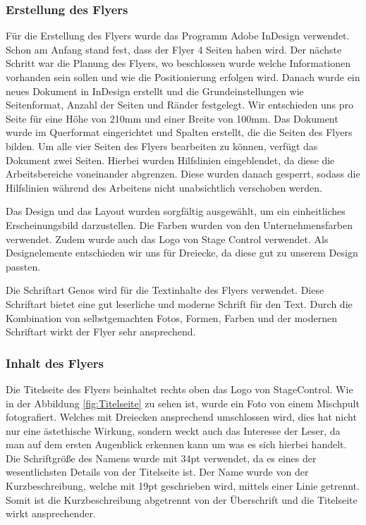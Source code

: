 \subsubsection{Erstellung des Flyers}
Für die Erstellung des Flyers wurde das Programm Adobe InDesign verwendet. Schon am Anfang stand fest, dass der Flyer 4 Seiten haben wird. Der nächste Schritt war die Planung des Flyers, wo beschlossen wurde welche Informationen vorhanden sein sollen und wie die Positionierung erfolgen wird. Danach wurde ein neues Dokument in InDesign erstellt und die Grundeinstellungen wie Seitenformat, Anzahl der Seiten und Ränder festgelegt. Wir entschieden uns pro Seite für eine Höhe von 210mm und einer Breite von 100mm. Das Dokument wurde im Querformat eingerichtet und Spalten erstellt, die die Seiten des Flyers bilden. Um alle vier Seiten des Flyers bearbeiten zu können, verfügt das Dokument zwei Seiten. Hierbei wurden Hilfslinien eingeblendet, da diese die Arbeitsbereiche voneinander abgrenzen. Diese wurden danach gesperrt, sodass die Hilfslinien während des Arbeitens nicht unabsichtlich verschoben werden. 

Das Design und das Layout wurden sorgfältig ausgewählt, um ein einheitliches Erscheinungsbild darzustellen. Die Farben wurden von den Unternehmensfarben verwendet. Zudem wurde auch das Logo von Stage Control verwendet. Als Designelemente entschieden wir uns für Dreiecke, da diese gut zu unserem Design passten. 

Die Schriftart Genos wird für die Textinhalte des Flyers verwendet. Diese Schriftart bietet eine gut leserliche und moderne Schrift für den Text. Durch die Kombination von selbstgemachten Fotos, Formen, Farben und der modernen Schriftart wirkt der Flyer sehr ansprechend. 

\subsubsection{Inhalt des Flyers}
Die Titelseite des Flyers beinhaltet rechts oben das Logo von StageControl. Wie in der Abbildung \ref{fig:Titelseite} zu sehen ist, wurde ein Foto von einem Mischpult fotografiert. Welches mit Dreiecken ansprechend umschlossen wird, dies hat nicht nur eine ästethische Wirkung, sondern weckt auch das Interesse der Leser, da man auf dem ersten Augenblick erkennen kann um was es sich hierbei handelt. 
Die Schriftgröße des Namens wurde mit 34pt verwendet, da es eines der wesentlichsten Details von der Titelseite ist. Der Name wurde von der Kurzbeschreibung, welche mit 19pt geschrieben wird, mittels einer Linie getrennt. Somit ist die Kurzbeschreibung abgetrennt von der Überschrift und die Titelseite wirkt ansprechender.

